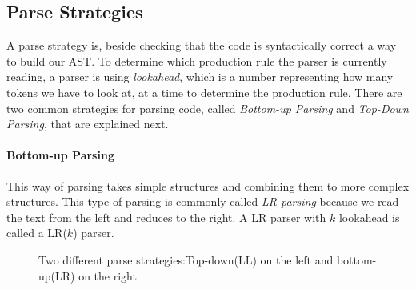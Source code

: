 	\subsection{Parse Strategies}
		\label{impl:parsestrats}
		A parse strategy is, beside checking that the code is syntactically correct a way to build our AST. 
		To determine which production rule the parser is currently reading, 
		a parser is using {\it lookahead}, which is a number representing how many tokens we have to look at, 
		at a time to determine the production rule.
		There are two common strategies for parsing code, called {\it Bottom-up Parsing} and {\it Top-Down Parsing}, that are explained next.
	\paragraph{Bottom-up Parsing}
		This way of parsing takes simple structures and combining them to more complex structures.
		This type of parsing is commonly called {\it LR parsing} because we read the text from the left and reduces to the right.
		A LR parser with $k$ lookahead is called a LR($k$) parser.
		\begin{figure}[H]
			\centering
			\caption{Two different parse strategies:Top-down(LL) on the left and bottom-up(LR) on the right}\label{fig:parsers}
		\end{figure}
		
